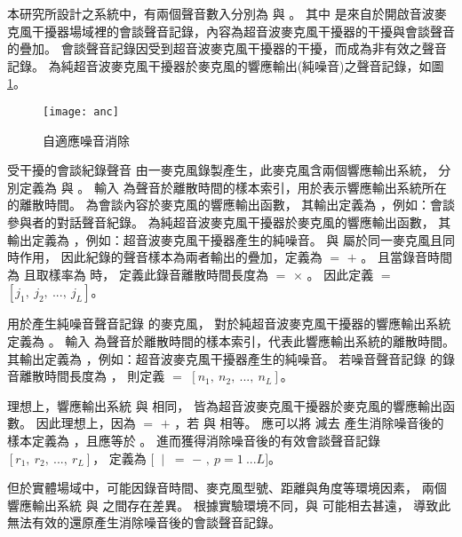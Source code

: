     本研究所設計之系統中，有兩個聲音數入分別為 \DEFrecJ 與 \DEFrecN。
其中 \DEFrecJ 是來自於開啟音波麥克風干擾器場域裡的會談聲音記錄，內容為超音波麥克風干擾器的干擾與會談聲音的疊加。
會談聲音記錄因受到超音波麥克風干擾器的干擾，而成為非有效之聲音記錄。
\DEFrecN 為純超音波麥克風干擾器於麥克風的響應輸出(純噪音)之聲音記錄，如圖 \ref{fig:anc}。

\begin{figure}[H]
    \centering
    \texttt{[image: anc]}
    \caption{自適應噪音消除}\label{fig:anc}
\end{figure}

    受干擾的會談紀錄聲音 \DEFrecJ 由一麥克風錄製產生，此麥克風含兩個響應輸出系統，
分別定義為 \DEFfuncMicConv{\DEFpause} 與 \DEFfuncMicUSJ{\DEFpause}。
輸入 \DEFpause 為聲音於離散時間的樣本索引，用於表示響應輸出系統所在的離散時間。
\DEFfuncMicConv{\DEFpause} 為會談內容於麥克風的響應輸出函數，
其輸出定義為 \DEFmicConv，例如：會談參與者的對話聲音紀錄。
\DEFfuncMicUSJ{\DEFpause} 為純超音波麥克風干擾器於麥克風的響應輸出函數，
其輸出定義為 \DEFmicUSJ，例如：超音波麥克風干擾器產生的純噪音。
\DEFfuncMicConv{\DEFpause} 與 \DEFfuncMicUSJ{\DEFpause} 屬於同一麥克風且同時作用，
因此紀錄的聲音樣本為兩者輸出的疊加，定義為 \DEFmicRecJ $=$ \DEFmicConv $+$ \DEFmicUSJ。
且當錄音時間為 \DEFtimeREC 且取樣率為 \DEFsamplerate 時，
定義此錄音離散時間長度為 \DEFtimeLen $=$ \DEFsamplerate $\times$ \DEFtimeREC。
因此定義 \DEFrecJ $=$ $[j_{1}, ~j_{2}, ~ ...,~ j_{L}]$。

    用於產生純噪音聲音記錄 \DEFrecN 的麥克風，
對於純超音波麥克風干擾器的響應輸出系統定義為 \DEFfuncMicUSN{\DEFpause}。
輸入 \DEFpause 為聲音於離散時間的樣本索引，代表此響應輸出系統的離散時間。
\DEFfuncMicUSN{\DEFpause} 其輸出定義為 \DEFmicUSN ，例如：超音波麥克風干擾器產生的純噪音。
若噪音聲音記錄 \DEFrecN 的錄音離散時間長度為 \DEFtimeLen，
則定義 \DEFrecN $=$ $[n_{1}, ~n_{2}, ~ ...,~ n_{L}]$。

    理想上，響應輸出系統 \DEFfuncMicUSN{\DEFpause} 與 \DEFfuncMicUSJ{\DEFpause} 相同，
皆為超音波麥克風干擾器於麥克風的響應輸出函數。
因此理想上，因為 \DEFmicRecJ $=$ \DEFmicConv $+$ \DEFmicUSJ，若 \DEFmicUSJ 與 \DEFmicUSN 相等。
應可以將 \DEFmicRecJ 減去 \DEFmicUSN 產生消除噪音後的樣本定義為 \DEFmicRecREV，且應等於 \DEFmicConv。
進而獲得消除噪音後的有效會談聲音記錄 $[r_{1}, ~r_{2}, ~ ...,~ r_L]$，
定義為 $[$ \DEFmicRecREV $~|~$ \DEFmicRecREV $=$ \DEFmicRecJ $-$ \DEFmicUSN $,~  p=1~...L]$。

    但於實體場域中，可能因錄音時間、麥克風型號、距離與角度等環境因素，
兩個響應輸出系統 \DEFfuncMicUSN{\DEFpause} 與 \DEFfuncMicUSJ{\DEFpause} 之間存在差異。
根據實驗環境不同，\DEFmicRecREV 與 \DEFmicConv 可能相去甚遠，
導致此無法有效的還原產生消除噪音後的會談聲音記錄。

